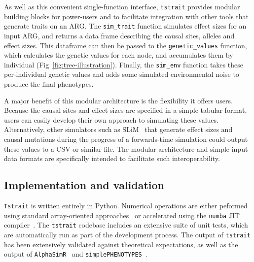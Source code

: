 \documentclass[unnumsec,webpdf,modern,large,namedate]{oup-authoring-template}%
\begin{document}
As well as this convenient single-function interface,
\texttt{tstrait} provides modular building blocks for power-users
and to facilitate integration with other tools that generate
traits on an ARG. The \texttt{sim\_trait} function
simulates effect sizes for an input ARG, and returns a data frame
describing the causal sites, alleles and effect sizes.
This dataframe can then be passed to the \texttt{genetic\_values}
function, which calculates the genetic values for each
node, and accumulates them by individual
(Fig~\ref{fig:tree-illustration}). Finally, the \texttt{sim\_env}
function takes these per-individual genetic values
and adds some simulated environmental noise to produce the final
phenotypes.

A major benefit of this modular architecture is the flexibility it offers
users. Because the causal sites and effect sizes are specified in a
simple tabular format, users can easily develop their own approach
to simulating these values. Alternatively, other simulators
such as SLiM~\citep{haller2023} that generate effect sizes and
causal mutations during the progress of a forwards-time simulation
could output these
values to a CSV or similar file. The modular architecture  and simple
input data formats are specifically intended to facilitate such
interoperability.

\subsection{Implementation and validation}
\texttt{Tstrait} is written entirely in Python. Numerical operations
are either peformed using standard array-oriented
approaches~\citep{numpy} or accelerated
using the \texttt{numba} JIT compiler~\citep{numba}.
The \texttt{tstrait} codebase includes an extensive suite of unit tests,
which are automatically run as part of the development process. The
output of \texttt{tstrait} has been extensively validated against
theoretical expectations, as well as the output
of \texttt{AlphaSimR}~\citep{gaynor2021} and
\texttt{simplePHENOTYPES}~\citep{fernandes2020}.
\end{document}
